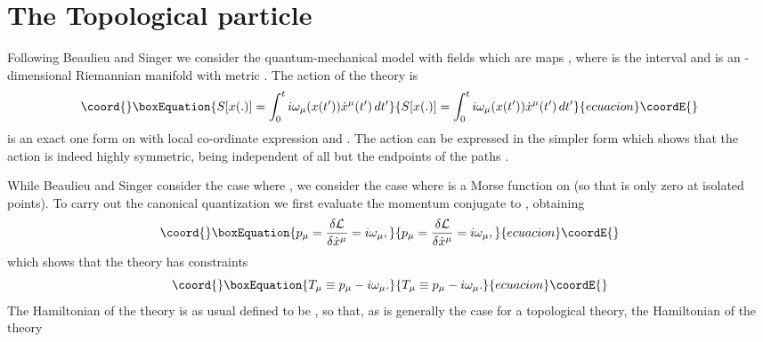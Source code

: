 \documentclass[a4paper,fleqn,12pt]{article}
\providecommand{\Intot}{\int_{0}^{t}}
\providecommand{\Omu}{\omega_{\mu}}
\providecommand{\Pmu}{p_{\mu}}
\providecommand{\Xmu}{x^{\mu}}
\providecommand{\Tmu}{T_{\mu}}
\providecommand{\Lag}{{\cal L}}
\begin{document}
 \section{The Topological particle}
%
Following Beaulieu and Singer \cite{BeaSin} we consider the
quantum-mechanical model with fields which are maps \coordHE{},
where \coordHE{} is the interval \myHighlight{$[0,t]$}\coordHE{} and \coordHE{} is an \coordHE{}-dimensional
Riemannian manifold with metric \coordHE{}. The action of the theory is
 \begin{equation}\coord{}\boxEquation{\label{ACeq}
  S[x(.)] = \Intot i\Omu(x(t'))\dot{x}^{\mu}(t') \, dt'
 }{S[x(.)] = \Intot i\Omu(x(t'))\dot{x}^{\mu}(t') \, dt'
 }{ecuacion}\coordE{}\end{equation}
\coordHE{} is an exact one form on \coordHE{} with local co-ordinate
expression \myHighlight{$\omega= \Omu(x) d\Xmu$}\coordHE{} and
 \coordHE{}. The action can
be expressed in the simpler form \coordHE{} which
shows that the action is indeed highly symmetric, being
independent of all but the endpoints of the paths \coordHE{}.
 \par
While Beaulieu and Singer consider the case where \coordHE{}, we
consider the case where \coordHE{} is a Morse function on \coordHE{} (so that
\coordHE{} is only zero at isolated points). To carry out the
canonical quantization we first evaluate the momentum \myHighlight{$\Pmu$}\coordHE{}
conjugate to \myHighlight{$\Xmu$}\coordHE{}, obtaining
 \begin{equation}\coord{}\boxEquation{\label{MOMeq}
  \Pmu = \frac{\delta \Lag}{\delta \dot{x}^\mu} = i\Omu,
 }{\Pmu = \frac{\delta \Lag}{\delta \dot{x}^\mu} = i\Omu,
 }{ecuacion}\coordE{}\end{equation}
which shows that the theory has \coordHE{} constraints
 \begin{equation}\coord{}\boxEquation{
   \Tmu \equiv \Pmu - i\Omu.
 }{
   \Tmu \equiv \Pmu - i\Omu.
 }{ecuacion}\coordE{}\end{equation}
The Hamiltonian of the theory is as usual defined to be
 \myHighlight{$H(p,x)= \Pmu \Xmu - \Lag(x,\dot{x})$}\coordHE{}, so that, as is generally
the case for a topological theory, the Hamiltonian of the theory
\end{document}
